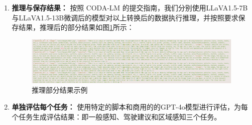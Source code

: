 \documentclass[
    linespread = 1.25
]{ctexart}
\begin{document}
\begin{enumerate}
  \item \textbf{推理与保存结果：}
        按照 CODA-LM 的提交指南，我们分别使用LLaVA1.5-7B与LLaVA1.5-13B微调后的模型对以上转换后的数据执行推理，并按照要求保存结果，推理后的部分结果如图\ref{fig:tuili}所示：
        \begin{figure}[h] %
          \centering %
          \includegraphics[width=1\textwidth]{tuili.jpg} %
          \caption{推理部分结果示例} %
          \label{fig:tuili} %
        \end{figure}

  \item \textbf{单独评估每个任务：}
        使用特定的脚本和商用的的GPT-4o模型进行评估，为每个任务生成评估结果：即一般感知、驾驶建议和区域感知三个任务。
\end{enumerate}
\end{document}
